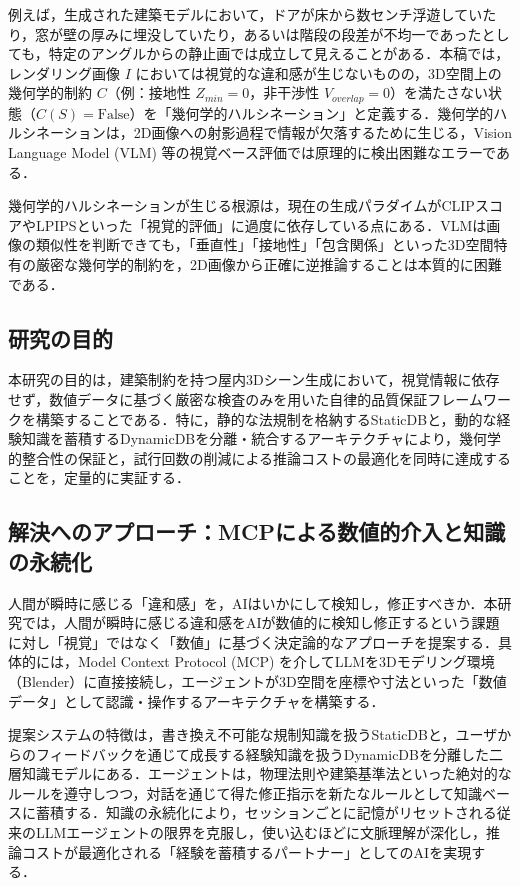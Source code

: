 \documentclass[dvipdfmx, a4paper, 9pt]{deimj}
\begin{document}
例えば，生成された建築モデルにおいて，ドアが床から数センチ浮遊していたり，窓が壁の厚みに埋没していたり，あるいは階段の段差が不均一であったとしても，特定のアングルからの静止画では成立して見えることがある．本稿では，レンダリング画像 $I$ においては視覚的な違和感が生じないものの，3D空間上の幾何学的制約 $C$（例：接地性 $Z_{min}=0$，非干渉性 $V_{overlap}=0$）を満たさない状態（$C(S) = \text{False}$）を「幾何学的ハルシネーション」と定義する．幾何学的ハルシネーションは，2D画像への射影過程で情報が欠落するために生じる，Vision Language Model (VLM) 等の視覚ベース評価では原理的に検出困難なエラーである．

幾何学的ハルシネーションが生じる根源は，現在の生成パラダイムがCLIPスコア\cite{radford2021clip}やLPIPS\cite{zhang2018lpips}といった「視覚的評価」に過度に依存している点にある．VLMは画像の類似性を判断できても，「垂直性」「接地性」「包含関係」といった3D空間特有の厳密な幾何学的制約を，2D画像から正確に逆推論することは本質的に困難である．

\subsection{研究の目的}

本研究の目的は，建築制約を持つ屋内3Dシーン生成において，視覚情報に依存せず，数値データに基づく厳密な検査のみを用いた自律的品質保証フレームワークを構築することである．特に，静的な法規制を格納するStaticDBと，動的な経験知識を蓄積するDynamicDBを分離・統合するアーキテクチャにより，幾何学的整合性の保証と，試行回数の削減による推論コストの最適化を同時に達成することを，定量的に実証する．

\subsection{解決へのアプローチ：MCPによる数値的介入と知識の永続化}

人間が瞬時に感じる「違和感」を，AIはいかにして検知し，修正すべきか．本研究では，人間が瞬時に感じる違和感をAIが数値的に検知し修正するという課題に対し「視覚」ではなく「数値」に基づく決定論的なアプローチを提案する．具体的には，Model Context Protocol (MCP)\cite{anthropic2024mcp} を介してLLMを3Dモデリング環境（Blender）に直接接続し，エージェントが3D空間を座標や寸法といった「数値データ」として認識・操作するアーキテクチャを構築する．

提案システムの特徴は，書き換え不可能な規制知識を扱うStaticDBと，ユーザからのフィードバックを通じて成長する経験知識を扱うDynamicDBを分離した二層知識モデルにある．エージェントは，物理法則や建築基準法といった絶対的なルールを遵守しつつ，対話を通じて得た修正指示を新たなルールとして知識ベースに蓄積する．知識の永続化により，セッションごとに記憶がリセットされる従来のLLMエージェントの限界を克服し，使い込むほどに文脈理解が深化し，推論コストが最適化される「経験を蓄積するパートナー」としてのAIを実現する．
\end{document}
